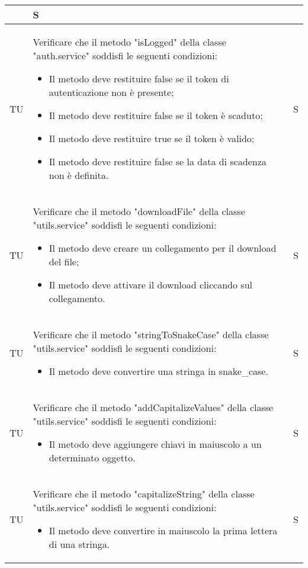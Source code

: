 \begin{adjustwidth}{-0.5cm}{-0.5cm}
\begin{longtable}{|P{1.5cm}|>{\raggedright}P{9.5cm}|>{\arraybackslash}P{1.5cm}|}
\begin{itemize}
    \end{itemize} & S \\
		\hline TU & Verificare che il metodo "isLogged" della classe "auth.service" soddisfi le seguenti condizioni:
		\begin{itemize}
			\item Il metodo deve restituire false se il token di autenticazione non è presente;
			\item Il metodo deve restituire false se il token è scaduto;
			\item Il metodo deve restituire true se il token è valido;
			\item Il metodo deve restituire false se la data di scadenza non è definita.
    \end{itemize} & S \\
		\hline TU & Verificare che il metodo "downloadFile" della classe "utils.service" soddisfi le seguenti condizioni:
		\begin{itemize}
			\item Il metodo deve creare un collegamento per il download del file;
			\item Il metodo deve attivare il download cliccando sul collegamento.
    \end{itemize} & S \\
		\hline TU & Verificare che il metodo "stringToSnakeCase" della classe "utils.service" soddisfi le seguenti condizioni:
		\begin{itemize}
			\item Il metodo deve convertire una stringa in snake\_case.
    \end{itemize} & S \\
		\hline TU & Verificare che il metodo "addCapitalizeValues" della classe "utils.service" soddisfi le seguenti condizioni:
		\begin{itemize}
			\item Il metodo deve aggiungere chiavi in maiuscolo a un determinato oggetto.
    \end{itemize} & S \\
		\hline TU & Verificare che il metodo "capitalizeString" della classe "utils.service" soddisfi le seguenti condizioni:
		\begin{itemize}
			\item Il metodo deve convertire in maiuscolo la prima lettera di una stringa.
    \end{itemize} & S \\
	\end{longtable}
\end{adjustwidth}
\egroup
